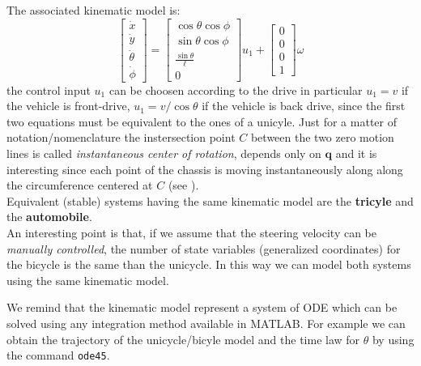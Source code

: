 \noindent
The associated kinematic model is:
\begin{equation}
    \begin{bmatrix}
        \dot{x}\\
        \dot{y}\\
        \dot{\theta}\\
        \dot{\phi}
    \end{bmatrix}=\begin{bmatrix}
        \cos\theta\cos\phi\\
        \sin\theta\cos\phi\\
        \frac{\sin\theta}{\ell}\\
        0
    \end{bmatrix}u_1 + \begin{bmatrix}
        0\\
        0\\
        0\\1
    \end{bmatrix}\omega
\end{equation}
the control input $u_1$ can be choosen according to the drive in particular $u_1=v$ if the vehicle is front-drive, $u_1=v/\cos\theta$ if the vehicle is back drive, since the first two equations must be equivalent to the ones of a unicyle. Just for a matter of notation/nomenclature the instersection point $C$ between the two zero motion lines is called \textit{instantaneous center of rotation}, depends only on $\mathbf{q}$ and it is interesting since each point of the chassis is moving instantaneously along along the circumference centered at $C$ (see ).\\
Equivalent (stable) systems having the same kinematic model are the \textbf{tricyle} and the \textbf{automobile}.\\
An interesting point is that, if we assume that the steering velocity can be \textit{manually controlled}, the number of state variables (generalized coordinates) for the bicycle is the same than the unicycle. In this way we can model both systems using the same kinematic model.
\begin{remark}
    We remind that the kinematic model represent a system of ODE which can be solved using any integration method available in MATLAB. For example we can obtain the trajectory of the unicycle/bicyle model and the time law for $\theta$ by using the command \texttt{ode45}.
\end{remark}

